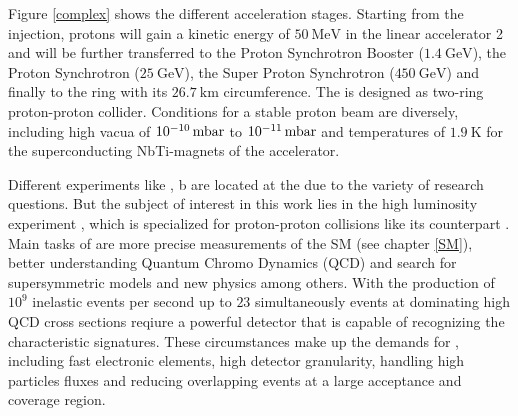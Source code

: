 Figure \ref{complex} shows the different acceleration stages. Starting from the injection, protons will gain a kinetic energy of $\SI{50}{\mega\electronvolt}$ in the linear accelerator {\LINAC}2 and will be further transferred to the Proton Synchrotron Booster ($\SI{1.4}{\giga\electronvolt}$), the Proton Synchrotron ($\SI{25}{\giga\electronvolt}$), the Super Proton Synchrotron ($\SI{450}{\giga\electronvolt}$) and finally to the {\LHC} ring with its $\SI{26.7}{\kilo\meter}$ circumference. \cite{CERNabout}\newline
The {\LHC} is designed as two-ring proton-proton collider. Conditions for a stable proton beam are diversely, including high vacua of $\SI{E-10}{\milli\bar}$ to $\SI{E-11}{\milli\bar}$ and temperatures of $\SI{1.9}{\kelvin}$ for the superconducting NbTi-magnets of the accelerator. \cite{LHCJINST}   
\par
Different experiments like \ALICE\cite{ALICE}, {{\LHC}}b\cite{LHCb} are located at the {\LHC} due to the variety of research questions. But the subject of interest in this work lies in the high luminosity experiment {\ATLAS}, which is specialized for proton-proton collisions like its counterpart \CMS\cite{CMS}. Main tasks of {\ATLAS} are more precise measurements of the SM (see chapter \ref{SM}), better understanding Quantum Chromo Dynamics (QCD) and search for supersymmetric models and new physics among others. With the {\LHC} production of $10^9$ inelastic events per second up to $23$ simultaneously events at dominating high QCD cross sections reqiure a powerful detector that is capable of recognizing the characteristic signatures. These circumstances make up the demands for {\ATLAS}, including fast electronic elements, high detector granularity, handling high particles fluxes and reducing overlapping events at a large acceptance and coverage region. \cite{ATLASJINST}       
